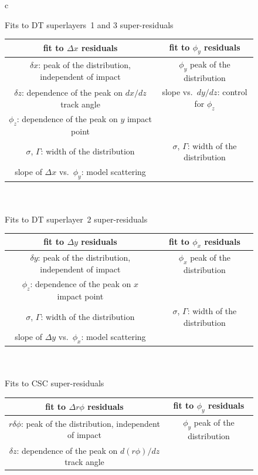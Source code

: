 \documentclass[12pt]{article}
\begin{document}
\begin{figure}
\begin{center}
\begin{tabular}{c}

Fits to DT superlayers~1 and 3 super-residuals \\
\begin{tabular}{| c | c |}
\hline fit to $\Delta x$ residuals & fit to $\phi_y$ residuals \\\hline
$\delta x$: peak of the distribution, independent of impact & $\phi_y$ peak of the distribution \\
$\delta z$: dependence of the peak on $dx/dz$ track angle & slope vs.\ $dy/dz$: control for $\phi_z$ \\
$\phi_z$: dependence of the peak on $y$ impact point & \\
$\sigma$, $\Gamma$: width of the distribution & $\sigma$, $\Gamma$: width of the distribution \\
slope of $\Delta x$ vs.~$\phi_y$: model scattering & \\\hline
\end{tabular} \\
\\
Fits to DT superlayer~2 super-residuals \\
\begin{tabular}{| c | c |}
\hline fit to $\Delta y$ residuals & fit to $\phi_x$ residuals \\\hline
$\delta y$: peak of the distribution, independent of impact & $\phi_x$ peak of the distribution \\
$\phi_z$: dependence of the peak on $x$ impact point & \\
$\sigma$, $\Gamma$: width of the distribution & $\sigma$, $\Gamma$: width of the distribution \\
slope of $\Delta y$ vs.~$\phi_x$: model scattering & \\\hline
\end{tabular} \\
\\
Fits to CSC super-residuals \\
\begin{tabular}{| c | c |}
\hline fit to $\Delta r\phi$ residuals & fit to $\phi_y$ residuals \\\hline
$r\delta\phi$: peak of the distribution, independent of impact & $\phi_y$ peak of the distribution \\
$\delta z$: dependence of the peak on $d(r\phi)/dz$ track angle & \\

\end{tabular}
\end{tabular}
\end{center}
\end{figure}
\end{document}
